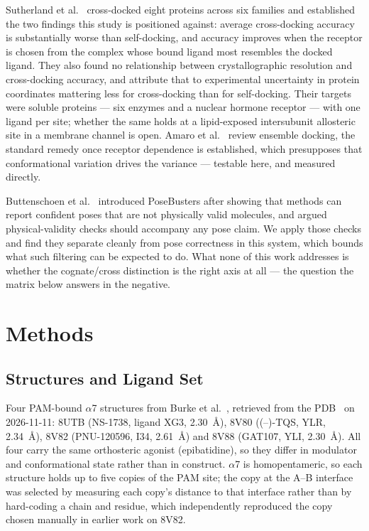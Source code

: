 \documentclass[sigconf]{acmart}
\begin{document}
Sutherland et al.~\cite{sutherland2007} cross-docked eight proteins across six
families and
established the two findings this study is positioned against: average
cross-docking accuracy is substantially worse than self-docking, and accuracy
improves when the receptor is chosen from the complex whose bound ligand most
resembles the docked ligand. They also found no relationship between
crystallographic resolution and cross-docking accuracy, and attribute that to
experimental uncertainty in protein coordinates mattering less for cross-docking
than for self-docking. Their targets were soluble
proteins --- six enzymes and a nuclear hormone receptor --- with one ligand per
site; whether the same holds at a lipid-exposed
intersubunit allosteric site in a membrane channel is open. Amaro et
al.~\cite{amaro2018} review ensemble docking, the standard remedy once receptor
dependence is established, which presupposes that conformational variation drives
the variance --- testable here, and measured directly.

Buttenschoen et al.~\cite{buttenschoen2024} introduced PoseBusters after showing
that methods can report confident poses that are not physically valid molecules,
and argued physical-validity checks should accompany any pose claim. We apply
those checks and find they separate cleanly from pose correctness in this system,
which bounds what such filtering can be expected to do. What none of this work
addresses is whether the cognate/cross distinction is the right axis at all ---
the question the matrix below answers in the negative.

\section{Methods}

\subsection{Structures and Ligand Set}

Four PAM-bound $\alpha$7 structures from Burke et al.~\cite{burke2024}, retrieved
from the PDB~\cite{berman2000pdb} on 2026-11-11: 8UTB (NS-1738, ligand XG3,
2.30~\AA), 8V80 ((--)-TQS, YLR, 2.34~\AA), 8V82 (PNU-120596, I34, 2.61~\AA) and
8V88 (GAT107, YLI, 2.30~\AA). All four carry the same orthosteric agonist
(epibatidine), so they differ in modulator and conformational state rather than in
construct. $\alpha$7 is homopentameric, so each structure holds up to five copies
of the PAM site; the copy at the A--B interface was selected by measuring each
copy's distance to that interface rather than by hard-coding a chain and residue,
which independently reproduced the copy chosen manually in earlier work on 8V82.
\end{document}
